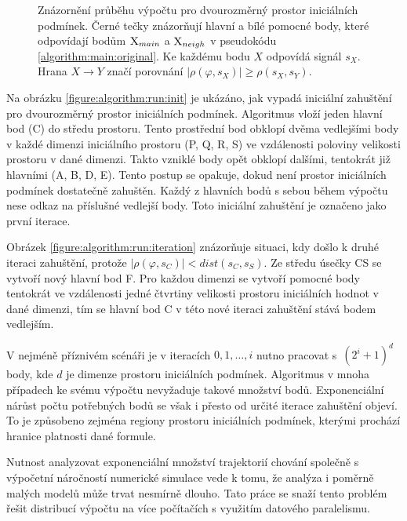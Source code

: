 \begin{figure}[H]
\begin{center}
{{
}}
\caption{Znázornění průběhu výpočtu pro dvourozměrný prostor iniciálních podmínek.
Černé tečky znázorňují hlavní a bílé pomocné body, které odpovídají bodům $\textsc{X}_{main}$ a $\textsc{X}_{neigh}$ v pseudokódu \ref{algorithm:main:original}.
Ke každému bodu $X$ odpovídá signál $s_X$. Hrana $X \rightarrow Y$ značí porovnání
$\big|\rho(\varphi, s_X)\big| \geq \rho(s_X, s_Y)$.}
\end{center}
\end{figure}

Na obrázku \ref{figure:algorithm:run:init} je ukázáno, jak vypadá iniciální zahuštění
pro dvourozměrný prostor iniciálních podmínek. Algoritmus vloží jeden hlavní bod (C) do středu prostoru. 
Tento prostřední bod obklopí dvěma vedlejšími body v každé dimenzi iniciálního prostoru (P, Q, R, S) ve vzdálenosti
poloviny velikosti prostoru v dané dimenzi. Takto vzniklé body opět obklopí dalšími, tentokrát již hlavními (A, B, D, E).
Tento postup se opakuje, dokud není prostor iniciálních podmínek dostatečně zahuštěn.
Každý z hlavních bodů s sebou během výpočtu nese odkaz na příslušné vedlejší body.
Toto iniciální zahuštění je označeno jako první iterace.

Obrázek \ref{figure:algorithm:run:iteration} znázorňuje situaci, kdy došlo k druhé iteraci zahuštění,
pro\-tože $\big|\rho(\varphi, s_C)\big| < dist(s_C, s_S)$. Ze středu úsečky CS se vytvoří
nový hlavní bod F. Pro každou dimenzi se vytvoří pomocné body tentokrát ve vzdá\-le\-nosti jedné čtvrtiny
velikosti prostoru iniciálních hodnot v dané dimenzi, tím se hlavní bod C v této
nové iteraci zahuštění stává bodem vedlejším.

V nejméně příznivém scénáři je v iteracích $0, 1, \ldots, i$ nutno pracovat s~$(2^i + 1)^d$ body,
kde $d$ je dimenze prostoru iniciálních podmínek. Algoritmus v mnoha případech
ke svému výpočtu nevyžaduje takové množství bodů. Expo\-nen\-ciál\-ní nárůst počtu
potřebných bodů se však i přesto od určité iterace za\-huš\-tě\-ní objeví. To je způsobeno
zejména regiony prostoru iniciálních podmínek, kterými prochází hranice platnosti dané formule.

Nutnost analyzovat exponenciální množství trajektorií chování společně s
výpočetní náročností numerické simulace vede k tomu, že analýza i po\-měr\-ně
malých modelů může trvat nesmírně dlouho. Tato práce se snaží tento problém řešit
distribucí výpočtu na více počítačích s využitím datového paralelismu.
